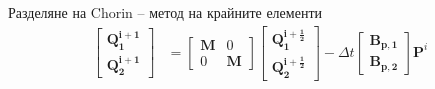 \documentclass{beamer}
\newcommand{\vecf}[1]{\boldsymbol{#1}}
\begin{document}
\begin{frame}{Разделяне на Chorin -- метод на крайните елементи}
\begin{equation*}
\begin{aligned}
\begin{bmatrix}
		\vecf{Q^{i+1}_1} \\
		\vecf{Q^{i+1}_2}
	\end{bmatrix} &=	\begin{bmatrix}
		\mathbf{M} & 0 \\
		0 & \mathbf{M}
	\end{bmatrix} \begin{bmatrix}
		\vecf{Q^{i+\frac{1}{2}}_1} \\
		\vecf{Q^{i+\frac{1}{2}}_2}
	\end{bmatrix} - \Delta t \begin{bmatrix}
		\vecf{B_{p,1}} \\
		\vecf{B_{p,2}}
	\end{bmatrix} \vecf{P}^i
\end{aligned}
		\end{equation*}
    \end{frame}
\end{document}
